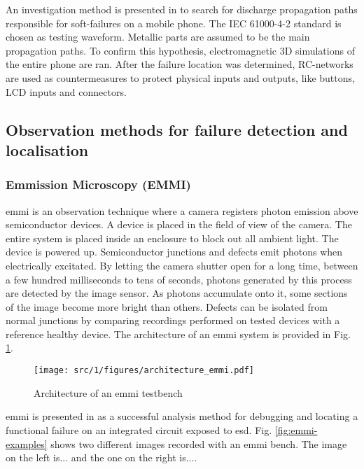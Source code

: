 An investigation method is presented in \cite{softFailMobile} to search for discharge propagation paths responsible for soft-failures on a mobile phone.
The IEC 61000-4-2 standard is chosen as testing waveform.
Metallic parts are assumed to be the main propagation paths.
To confirm this hypothesis, electromagnetic 3D simulations of the entire phone are ran.
After the failure location was determined, RC-networks are used as countermeasures to protect physical inputs and outputs, like buttons, LCD inputs and connectors.

\subsection{Observation methods for failure detection and localisation}

\subsubsection{Emmission Microscopy (EMMI)}

\gls{emmi} is an observation technique where a camera registers photon emission above semiconductor devices.
A device is placed in the field of view of the camera.
The entire system is placed inside an enclosure to block out all ambient light.
The device is powered up.
Semiconductor junctions and defects emit photons when electrically excitated.
By letting the camera shutter open for a long time, between a few hundred milliseconds to tens of seconds, photons generated by this process are detected by the image sensor.
As photons accumulate onto it, some sections of the image become more bright than others.
Defects can be isolated from normal junctions by comparing recordings performed on tested devices with a reference healthy device.
The architecture of an \gls{emmi} system is provided in Fig. \ref{fig:emmi}.

\begin{figure}[!h]
  \centering
  \texttt{[image: src/1/figures/architecture\_emmi.pdf]}
  \caption{Architecture of an emmi testbench}
  \label{fig:emmi}
\end{figure}

\gls{emmi} is presented in \cite{softfailEMMI} as a successful analysis method for debugging and locating a functional failure on an integrated circuit exposed to \gls{esd}.
Fig. \ref{fig:emmi-examples} shows two different images recorded with an \gls{emmi} bench.
The image on the left is... and the one on the right is....

